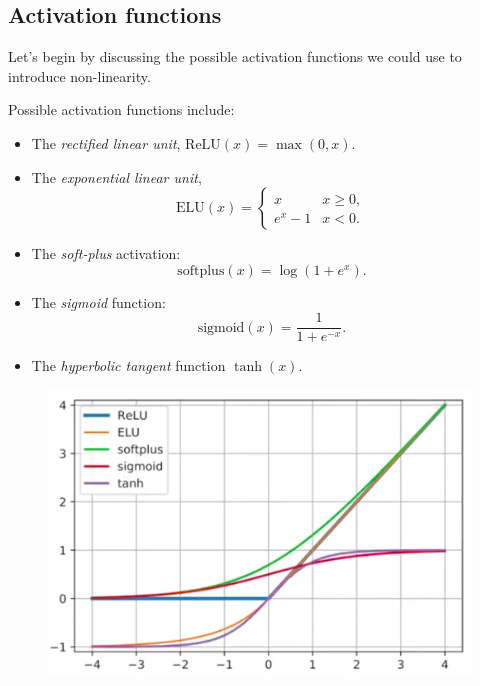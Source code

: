 \subsection{Activation functions}
Let's begin by discussing the possible activation functions we could use to introduce non-linearity.
\begin{framedef}
Possible activation functions include:
\begin{itemize}
\item The \textit{rectified linear unit}, $\textrm{ReLU}(x) = \max(0,x)$.
\item The \textit{exponential linear unit},
\begin{equation*}
\textrm{ELU}(x) = \begin{cases} x & x \geq 0, \\ e^x - 1 & x < 0. \end{cases}
\end{equation*}
\item The \textit{soft-plus} activation:
\begin{equation*}
\textrm{softplus}(x) = \log(1 + e^x).
\end{equation*}
\item The \textit{sigmoid} function:
\begin{equation*}
\textrm{sigmoid}(x) = \frac{1}{1 + e^{-x}}.
\end{equation*}
\item The \textit{hyperbolic tangent} function $\tanh(x)$.
\end{itemize}
\begin{figure}[H]
\centering
\includegraphics[scale=0.4]{activationfunctions.png}
\end{figure}
\end{framedef}

